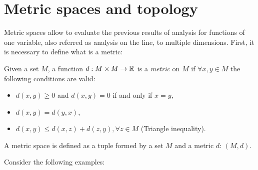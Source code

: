\chapter{Metric spaces and topology}

Metric spaces allow to evaluate the previous results of analysis for functions of one variable, also referred as analysis on the line, to multiple dimensions. First, it is necessary to define what is a metric:

\begin{definition}[Metric]
    Given a set $M$, a function $d: M \times M \to \mathbb{R}$ is a \emph{metric} on $M$ if $\forall x, y \in M$ the following conditions are valid:
    \begin{itemize}
        \item $d(x,y) \geq 0$ and $d(x,y) = 0$ if and only if $x=y$,
        \item $d(x,y) = d(y,x)$,
        \item $d(x,y) \leq d(x,z) + d(z,y), \forall z \in M$ (Triangle inequality).
    \end{itemize}
\end{definition}

A metric space is defined as a tuple formed by a set $M$ and a metric $d$: $(M, d)$.

Consider the following examples:

